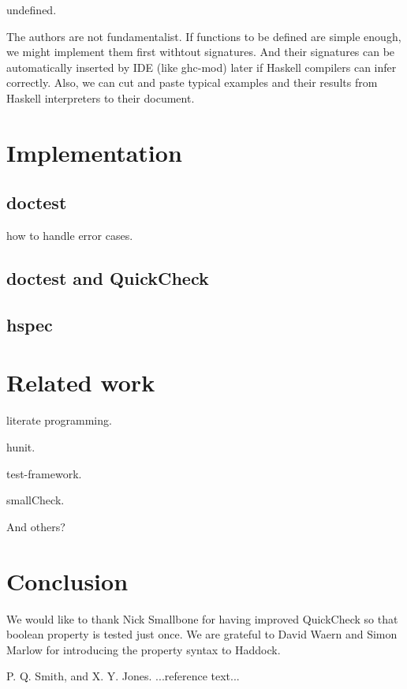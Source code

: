 \documentclass[preprint]{sigplanconf}
\begin{document}
undefined.

The authors are not fundamentalist.
If functions to be defined are simple enough,
we might implement them first withtout signatures.
And their signatures can be automatically
inserted by IDE (like ghc-mod) later
if Haskell compilers can infer correctly.
Also, we can cut and paste typical examples and their results
from Haskell interpreters to their document.

\section{Implementation}

\subsection{doctest}

how to handle error cases.

\subsection{doctest and QuickCheck}

\subsection{hspec}

\section{Related work}

literate programming.

hunit.

test-framework.

smallCheck.

And others?

\section{Conclusion}



\acks

We would like to thank
Nick Smallbone for having improved QuickCheck so that boolean property is tested
just once.
We are grateful to David Waern and Simon Marlow
for introducing the property syntax to Haddock.






\begin{thebibliography}{}
\softraggedright

P. Q. Smith, and X. Y. Jones. ...reference text...

\end{thebibliography}
\end{document}

